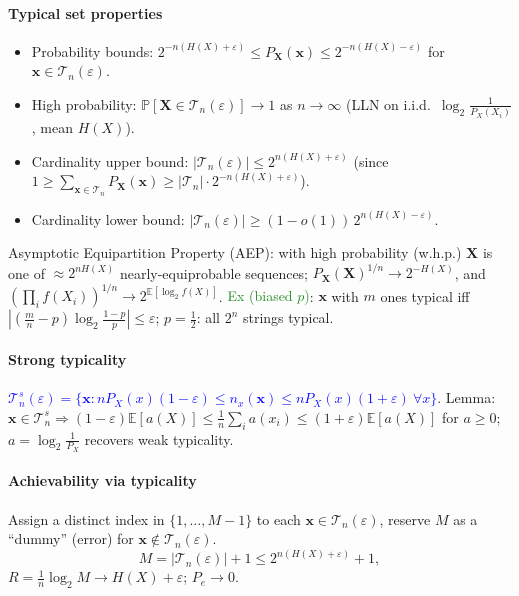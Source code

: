 \paragraph{Typical set properties}
\begin{itemize}
  \item \textcolor{Bittersweet}{Probability bounds}: $2^{-n(H(X)+\varepsilon)}\le P_{\mathbf X}(\mathbf x)\le 2^{-n(H(X)-\varepsilon)}$ for $\mathbf x\in\mathcal T_n(\varepsilon)$.
  \item \textcolor{Bittersweet}{High probability}:
    $\mathbb{P}[\mathbf{X}\in\mathcal{T}_n(\varepsilon)]\to 1$ as $n\to\infty$
    (LLN on i.i.d.\ $\log_2\tfrac{1}{P_X(X_i)}$, mean $H(X)$).
  \item \textcolor{Bittersweet}{Cardinality upper bound}:
    $|\mathcal{T}_n(\varepsilon)|\le 2^{n(H(X)+\varepsilon)}$ (since
    $1\ge\sum_{\mathbf{x}\in\mathcal T_n}P_{\mathbf X}(\mathbf x)\ge|\mathcal T_n|\cdot 2^{-n(H(X)+\varepsilon)}$).
  \item \textcolor{Bittersweet}{Cardinality lower bound}:
    $|\mathcal{T}_n(\varepsilon)|\ge(1-o(1))\,2^{n(H(X)-\varepsilon)}$.
\end{itemize}
\textcolor{Bittersweet}{Asymptotic Equipartition Property (AEP)}: with high probability (w.h.p.) $\mathbf X$ is one of $\approx 2^{nH(X)}$ nearly-equiprobable sequences; $P_{\mathbf X}(\mathbf X)^{1/n}\!\to\!2^{-H(X)}$, and $(\prod_i f(X_i))^{1/n}\!\to\!2^{\mathbb E[\log_2 f(X)]}$. \textcolor{ForestGreen}{Ex (biased $p$)}: $\mathbf x$ with $m$ ones typical iff $|(\tfrac{m}{n}{-}p)\log_2\tfrac{1-p}{p}|\le\varepsilon$; $p{=}\tfrac12$: all $2^n$ strings typical.
\paragraph{Strong typicality} \textcolor{Blue}{$\mathcal T_n^{s}(\varepsilon)=\{\mathbf x: nP_X(x)(1{-}\varepsilon)\le n_x(\mathbf x)\le nP_X(x)(1{+}\varepsilon)\ \forall x\}$}. \textcolor{Bittersweet}{Lemma}: $\mathbf x\in\mathcal T_n^{s}\!\Rightarrow(1{-}\varepsilon)\mathbb E[a(X)]\le\tfrac1n\sum_i a(x_i)\le(1{+}\varepsilon)\mathbb E[a(X)]$ for $a\ge 0$; $a{=}\log_2\tfrac{1}{P_X}$ recovers weak typicality.

\paragraph{Achievability via typicality}
Assign a distinct index in $\{1,\ldots,M-1\}$ to each
$\mathbf{x}\in\mathcal{T}_n(\varepsilon)$, reserve $M$ as a ``dummy'' (error) for
$\mathbf{x}\notin\mathcal{T}_n(\varepsilon)$.
\[M=|\mathcal T_n(\varepsilon)|+1\le 2^{n(H(X)+\varepsilon)}+1,\]
$R=\tfrac{1}{n}\log_2 M\to H(X)+\varepsilon$; $P_e\to 0$.

